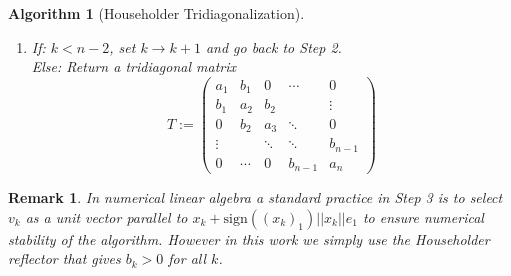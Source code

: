 \documentclass{amsart}
\newtheorem{rmk}[thm]{Remark}
\newtheorem{alg}[thm]{Algorithm}
\numberwithin{equation}{section}
\newcommand{\rvline}{\hspace*{-\arraycolsep}\vline\hspace*{-\arraycolsep}}
\begin{document}
\begin{alg}[Householder Tridiagonalization]
\begin{enumerate}
        \begin{equation}
            \begin{split}
                H_k^T A_k H_k &= 
                \begin{pmatrix}
                a_k
                & \rvline & \|x_k\| & 0 \\
                \hline
                \begin{matrix}
                    \|x_k\| \\ 0
                \end{matrix} & \rvline &
                \Tilde{H}_k^T \Tilde{A}_k \Tilde{H}_k
            \end{pmatrix}\\
            &=: \begin{pmatrix}
                a_k
                & \rvline & b_k & 0 \\
                \hline
                \begin{matrix}
                    b_k \\ 0
                \end{matrix} & \rvline &
                A_{k+1}
            \end{pmatrix}
            \end{split}
        \end{equation}
        \item If: $k< n-2$, set $k \to k+1$ and  go back to Step 2.\\
        Else: Return a tridiagonal matrix 
        \begin{equation}\label{eq:tridiagonalmatrix}
            T :=
            \begin{pmatrix}
                a_1 & b_1 & 0 &\cdots & 0 \\
                b_1 & a_2 & b_2 &  & \vdots \\
                0 & b_2 & a_3 & \ddots & 0  \\
                \vdots &  & \ddots & \ddots& b_{n-1} \\
                0 & \cdots  & 0 &  b_{n-1} & a_n
            \end{pmatrix}
        \end{equation}
    \end{enumerate}
    
\end{alg}    

\begin{rmk}
    In numerical linear algebra a standard practice in Step 3 is to select $v_k$ as a unit vector parallel to $x_k + \text{sign}((x_k)_1)||x_k||e_1$ to ensure numerical stability of the algorithm. However in this work we simply use the Householder reflector that gives $b_k > 0$ for all $k$. 
\end{rmk}
\end{document}
